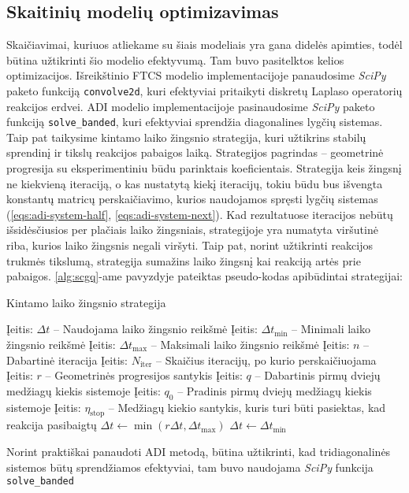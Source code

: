 \subsection{Skaitinių modelių optimizavimas}
Skaičiavimai, kuriuos atliekame su šiais modeliais yra gana didelės apimties, todėl būtina užtikrinti šio modelio efektyvumą. Tam buvo pasitelktos kelios optimizacijos. Išreikštinio FTCS modelio implementacijoje panaudosime \textit{SciPy} paketo funkciją \texttt{convolve2d}, kuri efektyviai pritaikyti diskretų Laplaso operatorių reakcijos erdvei. ADI modelio implementacijoje pasinaudosime \textit{SciPy} paketo funkciją \texttt{solve\_banded}, kuri efektyviai sprendžia diagonalines lygčių sistemas. Taip pat taikysime kintamo laiko žingsnio strategija, kuri užtikrins stabilų sprendinį ir tikslų reakcijos pabaigos laiką. Strategijos pagrindas -- geometrinė progresija su eksperimentiniu būdu parinktais koeficientais. Strategija keis žingsnį ne kiekvieną iteraciją, o kas nustatytą kiekį iteracijų, tokiu būdu bus išvengta konstantų matricų perskaičiavimo, kurios naudojamos spręsti lygčių sistemas (\ref{eqs:adi-system-half}, \ref{eqs:adi-system-next}). Kad rezultatuose iteracijos nebūtų išsidėsčiusios per plačiais laiko žingsniais, strategijoje yra numatyta viršutinė riba, kurios laiko žingsnis negali viršyti. Taip pat, norint užtikrinti reakcijos trukmės tikslumą, strategija sumažins laiko žingsnį kai reakciją artės prie pabaigos. \ref{alg:scgq}-ame pavyzdyje pateiktas pseudo-kodas apibūdintai strategijai:
\begin{algorithm}[h]
  \caption{Kintamo laiko žingsnio strategija}\label{alg:scgq}
  \begin{algorithmic}[1]
    \STATE Įeitis: $\Delta t$ -- Naudojama laiko žingsnio reikšmė
    \STATE Įeitis: $\Delta t_\text{min}$ -- Minimali laiko žingsnio reikšmė
    \STATE Įeitis: $\Delta t_\text{max}$ -- Maksimali laiko žingsnio reikšmė
    \STATE Įeitis: $n$ -- Dabartinė iteracija
    \STATE Įeitis: $N_{\text{iter}}$ -- Skaičius iteracijų, po kurio perskaičiuojama 
    \STATE Įeitis: $r$ -- Geometrinės progresijos santykis
    \STATE Įeitis: $q$ -- Dabartinis pirmų dviejų medžiagų kiekis sistemoje
    \STATE Įeitis: $q_0$ -- Pradinis pirmų dviejų medžiagų kiekis sistemoje
    \STATE Įeitis: $\eta_\text{stop}$ -- Medžiagų kiekio santykis, kuris turi būti pasiektas, kad reakcija pasibaigtų
      \STATE $\Delta t \gets \min(r\Delta t, \Delta t_\text{max})$
    \ENDIF
      \STATE $\Delta t \gets \Delta t_\text{min}$
    \ENDIF
  \end{algorithmic}
\end{algorithm}
Norint praktiškai panaudoti ADI metodą, būtina užtikrinti, kad tridiagonalinės sistemos būtų sprendžiamos efektyviai, tam buvo naudojama \textit{SciPy} funkcija \texttt{solve\_banded}
\newpage
